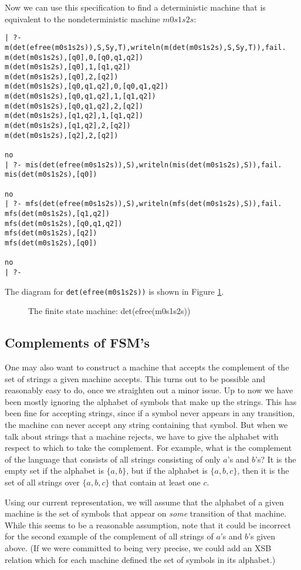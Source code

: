 Now we can use this specification to find a deterministic machine that
is equivalent to the nondeterministic machine $m0s1s2s$:
\begin{verbatim}
| ?- m(det(efree(m0s1s2s)),S,Sy,T),writeln(m(det(m0s1s2s),S,Sy,T)),fail.
m(det(m0s1s2s),[q0],0,[q0,q1,q2])
m(det(m0s1s2s),[q0],1,[q1,q2])
m(det(m0s1s2s),[q0],2,[q2])
m(det(m0s1s2s),[q0,q1,q2],0,[q0,q1,q2])
m(det(m0s1s2s),[q0,q1,q2],1,[q1,q2])
m(det(m0s1s2s),[q0,q1,q2],2,[q2])
m(det(m0s1s2s),[q1,q2],1,[q1,q2])
m(det(m0s1s2s),[q1,q2],2,[q2])
m(det(m0s1s2s),[q2],2,[q2])

no
| ?- mis(det(efree(m0s1s2s)),S),writeln(mis(det(m0s1s2s),S)),fail.
mis(det(m0s1s2s),[q0])

no
| ?- mfs(det(efree(m0s1s2s)),S),writeln(mfs(det(m0s1s2s),S)),fail.
mfs(det(m0s1s2s),[q1,q2])
mfs(det(m0s1s2s),[q0,q1,q2])
mfs(det(m0s1s2s),[q2])
mfs(det(m0s1s2s),[q0])

no
| ?- 
\end{verbatim}

The diagram for \verb|det(efree(m0s1s2s))| is shown in Figure
\ref{detm0s1s2s}.

\begin{figure}
\centerline{}
\caption{The finite state machine: det(efree(m0s1s2s))}\label{detm0s1s2s}
\end{figure}

\subsection{Complements of FSM's}

One may also want to construct a machine that accepts the complement
of the set of strings a given machine accepts.  This turns out to be
possible and reasonably easy to do, once we straighten out a minor
issue.  Up to now we have been mostly ignoring the alphabet of symbols
that make up the strings.  This has been fine for accepting strings,
since if a symbol never appears in any transition, the machine can
never accept any string containing that symbol.  But when we talk
about strings that a machine rejects, we have to give the alphabet
with respect to which to take the complement.  For example, what is
the complement of the language that consists of all strings consisting
of only $a$'s and $b$'s?  It is the empty set if the alphabet is
$\{a,b\}$, but if the alphabet is $\{a,b,c\}$, then it is the set of
all strings over $\{a,b,c\}$ that contain at least one $c$.

Using our current representation, we will assume that the alphabet of
a given machine is the set of symbols that appear on {\em some}
transition of that machine.  While this seems to be a reasonable
assumption, note that it could be incorrect for the second example of
the complement of all strings of $a$'s and $b$'s given above.  (If we
were committed to being very precise, we could add an XSB relation
which for each machine defined the set of symbols in its alphabet.)

